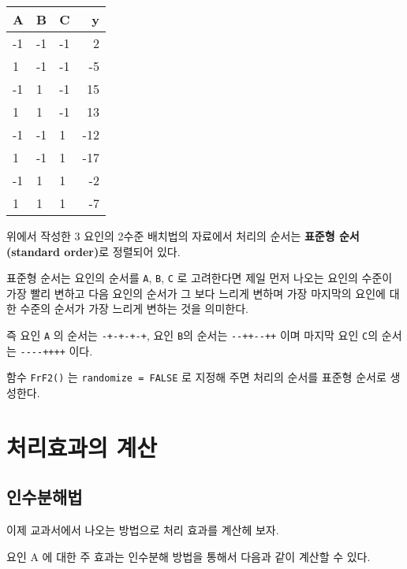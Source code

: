 \documentclass[
]{book}
\makeatletter
\newenvironment{kframe}{%
\medskip{}
\setlength{\fboxsep}{.8em}
 \def\at@end@of@kframe{}%
 \ifinner\ifhmode%
  \def\at@end@of@kframe{\end{minipage}}%
  \begin{minipage}{\columnwidth}%
 \fi\fi%
 \def\FrameCommand##1{\hskip\@totalleftmargin \hskip-\fboxsep
 \colorbox{shadecolor}{##1}\hskip-\fboxsep
     \hskip-\linewidth \hskip-\@totalleftmargin \hskip\columnwidth}%
 \MakeFramed {\advance\hsize-\width
   \@totalleftmargin\z@ \linewidth\hsize
   \@setminipage}}%
 {\par\unskip\endMakeFramed%
 \at@end@of@kframe}
\newenvironment{rmdblock}[1]
  {
  \begin{itemize}
  \renewcommand{\labelitemi}{
    \raisebox{-.7\height}[0pt][0pt]{
      {\setkeys{Gin}{width=3em,keepaspectratio}\texttt{[image: images/\#1]}}
    }
  }
  \setlength{\fboxsep}{1em}
  \begin{kframe}
  \item
  }
  {
  \end{kframe}
  \end{itemize}
  }
\newenvironment{rmdimportant}
  {\begin{rmdblock}{important}}
  {\end{rmdblock}}
\makeatother
\begin{document}
\begin{table}
\centering
\begin{tabular}[t]{l|l|l|r}
\hline
A & B & C & y\\
\hline
-1 & -1 & -1 & 2\\
\hline
1 & -1 & -1 & -5\\
\hline
-1 & 1 & -1 & 15\\
\hline
1 & 1 & -1 & 13\\
\hline
-1 & -1 & 1 & -12\\
\hline
1 & -1 & 1 & -17\\
\hline
-1 & 1 & 1 & -2\\
\hline
1 & 1 & 1 & -7\\
\hline
\end{tabular}
\end{table}

\begin{rmdimportant}
위에서 작성한 3 요인의 2수준 배치법의 자료에서 처리의 순서는 \textbf{표준형 순서(standard order)}로
정렬되어 있다.

표준형 순서는 요인의 순서를 \texttt{A}, \texttt{B}, \texttt{C} 로 고려한다면 제일 먼저 나오는
요인의 수준이 가장 빨리 변하고 다음 요인의 순서가 그 보다 느리게 변하며 가장 마지막의 요인에 대한 수준의 순서가 가장 느리게 변하는 것을 의미한다.

즉 요인 \texttt{A} 의 순서는 \texttt{-+-+-+-+}, 요인 \texttt{B}의 순서는 \texttt{-\/-++-\/-++} 이며 마지막 요인 \texttt{C}의 순서는
\texttt{-\/-\/-\/-++++} 이다.

함수 \texttt{FrF2()} 는 \texttt{randomize\ =\ FALSE} 로 지정해 주면 처리의 순서를 표준형 순서로 생성한다.\\
\end{rmdimportant}

\hypertarget{uxcc98uxb9acuxd6a8uxacfcuxc758-uxacc4uxc0b0}{%
\section{처리효과의 계산}\label{uxcc98uxb9acuxd6a8uxacfcuxc758-uxacc4uxc0b0}}

\hypertarget{uxc778uxc218uxbd84uxd574uxbc95}{%
\subsection{인수분해법}\label{uxc778uxc218uxbd84uxd574uxbc95}}

이제 교과서에서 나오는 방법으로 처리 효과를 계산헤 보자.

요인 A 에 대한 주 효과는 인수분해 방법을 통해서 다음과 같이 계산할 수 있다.
\end{document}
